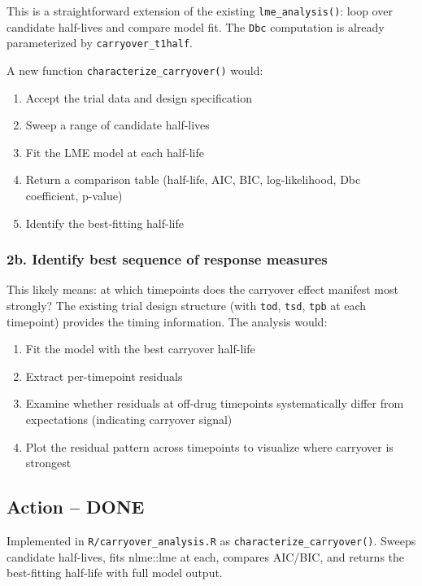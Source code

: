 \documentclass[11pt]{article}
\begin{document}
This is a straightforward extension of the existing
\texttt{lme\_analysis()}: loop over candidate half-lives and
compare model fit. The \texttt{Dbc} computation is already
parameterized by \texttt{carryover\_t1half}.

A new function \texttt{characterize\_carryover()} would:

\begin{enumerate}
  \item Accept the trial data and design specification
  \item Sweep a range of candidate half-lives
  \item Fit the LME model at each half-life
  \item Return a comparison table (half-life, AIC, BIC,
    log-likelihood, Dbc coefficient, p-value)
  \item Identify the best-fitting half-life
\end{enumerate}

\subsubsection{2b. Identify best sequence of response measures}

This likely means: at which timepoints does the carryover
effect manifest most strongly? The existing trial design
structure (with \texttt{tod}, \texttt{tsd}, \texttt{tpb} at each timepoint)
provides the timing information. The analysis would:

\begin{enumerate}
  \item Fit the model with the best carryover half-life
  \item Extract per-timepoint residuals
  \item Examine whether residuals at off-drug timepoints
    systematically differ from expectations (indicating
    carryover signal)
  \item Plot the residual pattern across timepoints to
    visualize where carryover is strongest
\end{enumerate}

\subsection{Action -- DONE}

Implemented in \texttt{R/carryover\_analysis.R} as
\texttt{characterize\_carryover()}. Sweeps candidate half-lives,
fits nlme::lme at each, compares AIC/BIC, and returns the
best-fitting half-life with full model output.
\end{document}
